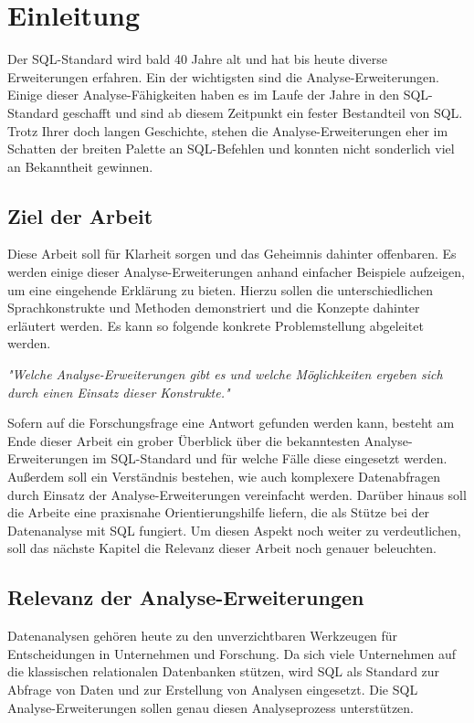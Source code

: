 \chapter{Einleitung}
\label{chap:einleitung} Der SQL-Standard wird bald 40 Jahre alt und hat bis heute
diverse Erweiterungen erfahren. Ein der wichtigsten sind die Analyse-Erweiterungen.
Einige dieser Analyse-Fähigkeiten haben es im Laufe der Jahre in den SQL-Standard
geschafft und sind ab diesem Zeitpunkt ein fester Bestandteil von SQL. Trotz
Ihrer doch langen Geschichte, stehen die Analyse-Erweiterungen eher im Schatten der
breiten Palette an SQL-Befehlen und konnten nicht sonderlich viel an Bekanntheit
gewinnen.

\section{Ziel der Arbeit}
\label{sec:ziel_der_arbeit} Diese Arbeit soll für Klarheit sorgen und das Geheimnis
dahinter offenbaren. Es werden einige dieser Analyse-Erweiterungen anhand
einfacher Beispiele aufzeigen, um eine eingehende Erklärung zu bieten. Hierzu
sollen die unterschiedlichen Sprachkonstrukte und Methoden demonstriert und die
Konzepte dahinter erläutert werden. Es kann so folgende konkrete Problemstellung
abgeleitet werden.
\begin{center}
	\textit{"Welche Analyse-Erweiterungen gibt es und welche Möglichkeiten ergeben
	sich durch einen Einsatz dieser Konstrukte."}
\end{center}
Sofern auf die Forschungsfrage eine Antwort gefunden werden kann, besteht am Ende
dieser Arbeit ein grober Überblick über die bekanntesten Analyse-Erweiterungen im
SQL-Standard und für welche Fälle diese eingesetzt werden. Außerdem soll ein
Verständnis bestehen, wie auch komplexere Datenabfragen durch Einsatz der Analyse-Erweiterungen
vereinfacht werden. Darüber hinaus soll die Arbeite eine praxisnahe
Orientierungshilfe liefern, die als Stütze bei der Datenanalyse mit SQL fungiert.
Um diesen Aspekt noch weiter zu verdeutlichen, soll das nächste Kapitel die Relevanz
dieser Arbeit noch genauer beleuchten.

\section{Relevanz der Analyse-Erweiterungen}
\label{sec:relevant} Datenanalysen gehören heute zu den unverzichtbaren Werkzeugen
für Entscheidungen in Unternehmen und Forschung. Da sich viele Unternehmen auf
die klassischen relationalen Datenbanken stützen, wird SQL als Standard zur Abfrage
von Daten und zur Erstellung von Analysen eingesetzt. Die SQL Analyse-Erweiterungen
sollen genau diesen Analyseprozess unterstützen.

